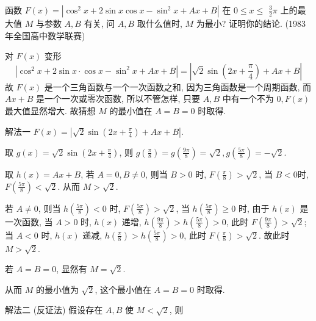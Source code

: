 \begin{example}
	函数 $F(x)=\left|\cos ^{2} x+2 \sin x \cos x-\sin ^{2} x+A x+B\right|$ 在 $0 \leqslant x \leqslant$ $\frac{3}{2} \pi$ 上的最大值 $M$ 与参数 $A ,  B$ 有关, 问 $A ,  B$ 取什么值时, $M$ 为最小? 证明你的结论. (1983 年全国高中数学联赛)
\end{example}
\begin{analysis}
	对 $F(x)$ 变形
	$$
		\left|\cos ^{2} x+2 \sin x \cdot \cos x-\sin ^{2} x+A x+B\right|=\left|\sqrt{2} \sin \left(2 x+\frac{\pi}{4}\right)+A x+B\right|
	$$
	故 $F(x)$ 是一个三角函数与一个一次函数之和, 因为三角函数是一个周期函数, 而 $A x+B$ 是一个一次或零次函数, 所以不管怎样, 只要 $A ,  B$ 中有一个不为 $0, F(x)$ 最大值显然增大. 故猜想 $M$ 的最小值在 $A=B=0$ 时取得.
\end{analysis}
\begin{solution}
	解法一 $F(x)=\left|\sqrt{2} \sin \left(2 x+\frac{\pi}{4}\right)+A x+B\right|$.

	取 $g(x)=\sqrt{2} \sin \left(2 x+\frac{\pi}{4}\right)$, 则 $g\left(\frac{\pi}{8}\right)=g\left(\frac{9 \pi}{8}\right)=\sqrt{2}, g\left(\frac{5 \pi}{8}\right)=-\sqrt{2}$.

	取 $h(x)=A x+B$, 若 $A=0, B \neq 0$, 则当 $B>0$ 时, $F\left(\frac{\pi}{8}\right)>\sqrt{2}$, 当 $B<0$时, $F\left(\frac{5 \pi}{8}\right)<\sqrt{2}$. 从而 $M>\sqrt{2}$.

	若 $A \neq 0$, 则当 $h\left(\frac{5 \pi}{8}\right)<0$ 时, $F\left(\frac{5 \pi}{8}\right)>\sqrt{2}$, 当 $h\left(\frac{5 \pi}{8}\right) \geqslant 0$ 时, 由于 $h(x)$ 是\\
	一次函数, 当 $A>0$ 时, $h(x)$ 递增, $h\left(\frac{9 \pi}{8}\right)>h\left(\frac{5 \pi}{8}\right)>0$, 此时 $F\left(\frac{9 \pi}{8}\right)>\sqrt{2}$; 当 $A<0$ 时, $h(x)$ 递减, $h\left(\frac{\pi}{8}\right)>h\left(\frac{5 \pi}{8}\right)>0$, 此时 $F\left(\frac{\pi}{8}\right)>\sqrt{2}$. 故此时 $M>\sqrt{2}$.

	若 $A=B=0$, 显然有 $M=\sqrt{2}$.

	从而 $M$ 的最小值为 $\sqrt{2}$, 这个最小值在 $A=B=0$ 时取得.

	解法二 (反证法) 假设存在 $A ,  B$ 使 $M<\sqrt{2}$, 则


\end{solution}

